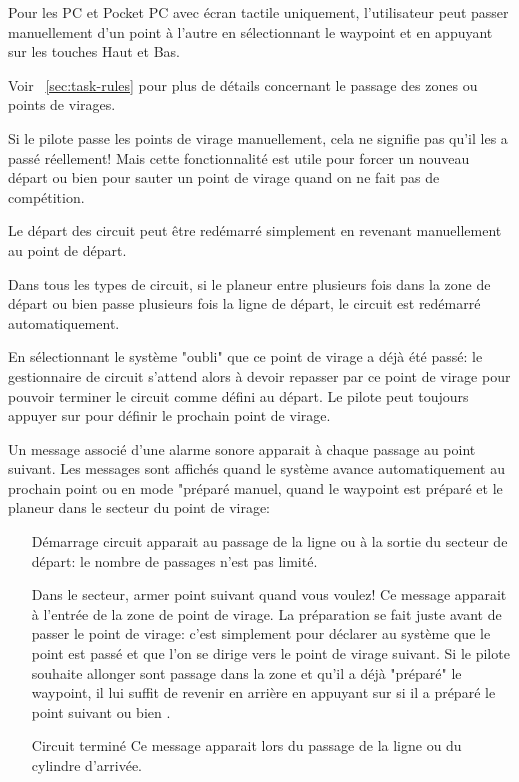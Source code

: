 Pour les PC et Pocket PC avec écran tactile uniquement, l'utilisateur peut passer manuellement d'un point à l'autre en sélectionnant le waypoint {\InfoBox}  et en appuyant sur les touches Haut et Bas.

Voir ~\ref{sec:task-rules} pour plus de détails concernant le passage des zones ou points de virages. 

Si le pilote passe les points de virage manuellement, cela ne signifie pas qu'il les a passé réellement! Mais cette fonctionnalité est utile pour forcer un nouveau départ ou bien pour sauter un point de virage quand on ne fait pas de compétition.

\tip Le départ des circuit peut être redémarré simplement en revenant manuellement au point de départ.

Dans tous les types de circuit, si le planeur entre plusieurs fois dans la zone de départ ou bien passe plusieurs fois la ligne de départ, le circuit est redémarré automatiquement.

En sélectionnant  le système "oubli" que ce point de virage a déjà été passé: le gestionnaire de circuit s'attend alors à devoir repasser par ce point de virage pour pouvoir terminer le circuit comme défini au départ. Le pilote peut toujours appuyer sur  pour définir le prochain point de virage.

Un message associé d'une alarme sonore apparait à chaque passage au point suivant. Les messages sont affichés quand le système avance automatiquement au prochain point  ou en mode "préparé manuel, quand le waypoint est préparé et le planeur dans le secteur du point de virage:
\begin{itemize}
\item[Démarrage circuit]  apparait au passage de la ligne ou à la sortie du secteur de départ: le nombre de passages n'est pas limité.
\item[Dans le secteur,]  armer point suivant quand vous voulez! Ce message apparait à l'entrée de la zone de point de virage. La préparation se fait juste avant de passer le point de virage: c'est simplement pour déclarer au système que le point est passé et que l'on se dirige vers le point de virage suivant. Si le pilote souhaite allonger sont passage dans la zone et qu'il a déjà "préparé" le waypoint, il lui suffit de revenir en arrière en appuyant sur  si il a préparé le point suivant ou bien .
\item[Circuit terminé]  Ce message apparait lors du passage de la ligne ou du cylindre d'arrivée. 
\end{itemize}

